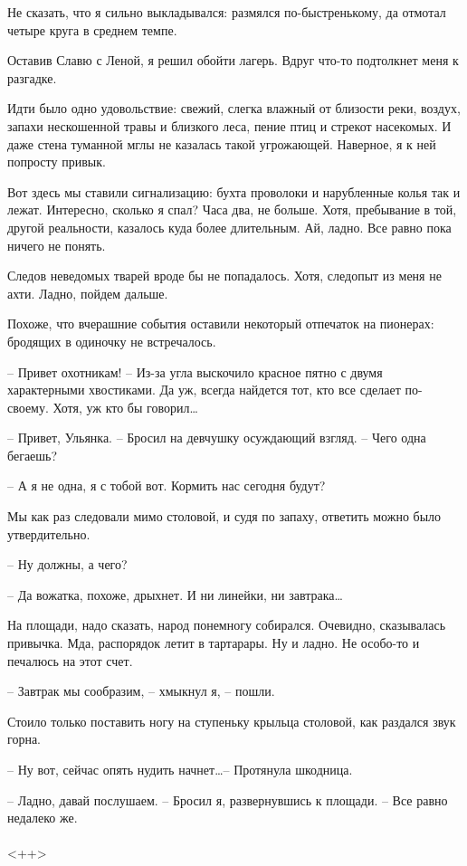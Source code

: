 \documentclass[a4paper]{book}
\begin{document}
Не сказать, что я сильно выкладывался: размялся по-быстренькому, да отмотал четыре круга в среднем темпе. 

Оставив Славю с Леной, я решил обойти лагерь. Вдруг что-то подтолкнет меня к разгадке. 

Идти было одно удовольствие: свежий, слегка влажный от близости реки, воздух, запахи нескошенной травы и близкого леса, пение птиц и стрекот насекомых. И даже стена туманной мглы не казалась такой угрожающей. Наверное, я к ней попросту привык. 

Вот здесь мы ставили сигнализацию: бухта проволоки и нарубленные колья так и лежат. Интересно, сколько я спал? Часа два, не больше. Хотя, пребывание в той, другой реальности, казалось куда более длительным. Ай, ладно. Все равно пока ничего не понять.

Следов неведомых тварей вроде бы не попадалось. Хотя, следопыт из меня не ахти. Ладно, пойдем дальше.

Похоже, что вчерашние события  оставили некоторый отпечаток на пионерах: бродящих в одиночку не встречалось. 

-- Привет охотникам! -- Из-за угла выскочило красное пятно с двумя характерными хвостиками. Да уж, всегда найдется тот, кто все сделает по-своему. Хотя, уж кто бы говорил\ldots

-- Привет, Ульянка. -- Бросил на девчушку осуждающий взгляд. -- Чего одна бегаешь?

-- А я не одна, я с тобой вот. Кормить нас сегодня будут?

Мы как раз следовали мимо столовой, и судя по запаху, ответить можно было утвердительно.

-- Ну должны, а чего?

-- Да вожатка, похоже, дрыхнет. И ни линейки, ни завтрака\ldots

На площади, надо сказать, народ понемногу собирался. Очевидно, сказывалась привычка. Мда, распорядок летит в тартарары. Ну и ладно. Не особо-то и печалюсь на этот счет. 

-- Завтрак мы сообразим, -- хмыкнул я, -- пошли.

Стоило только поставить ногу на ступеньку крыльца столовой, как раздался звук горна. 

-- Ну вот, сейчас опять нудить начнет\ldots -- Протянула шкодница. 

-- Ладно, давай послушаем. -- Бросил я, развернувшись к площади. -- Все равно недалеко же.

\paragraph{}<++>
\end{document}

